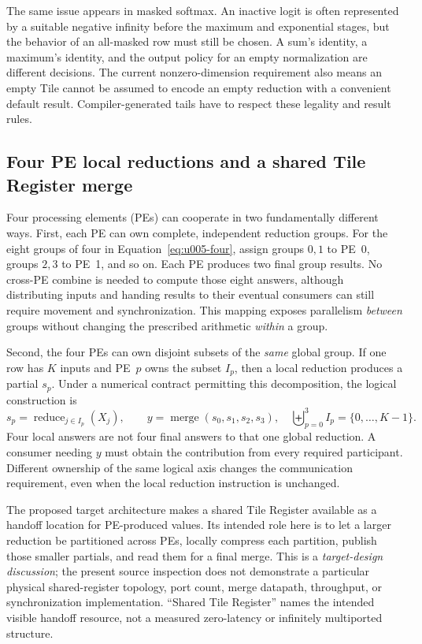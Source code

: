 The same issue appears in masked softmax. An inactive logit is often represented by a suitable negative infinity before the maximum and exponential stages, but the behavior of an all-masked row must still be chosen. A sum's identity, a maximum's identity, and the output policy for an empty normalization are different decisions. The current nonzero-dimension requirement also means an empty Tile cannot be assumed to encode an empty reduction with a convenient default result. Compiler-generated tails have to respect these legality and result rules.

\subsection{Four PE local reductions and a shared Tile Register merge}
\label{sec:u005-four-pe}

Four processing elements (PEs) can cooperate in two fundamentally different ways. First, each PE can own complete, independent reduction groups. For the eight groups of four in Equation~\ref{eq:u005-four}, assign groups $0,1$ to PE~0, groups $2,3$ to PE~1, and so on. Each PE produces two final group results. No cross-PE combine is needed to compute those eight answers, although distributing inputs and handing results to their eventual consumers can still require movement and synchronization. This mapping exposes parallelism \emph{between} groups without changing the prescribed arithmetic \emph{within} a group.

Second, the four PEs can own disjoint subsets of the \emph{same} global group. If one row has $K$ inputs and PE~$p$ owns the subset $I_p$, then a local reduction produces a partial $s_p$. Under a numerical contract permitting this decomposition, the logical construction is
\begin{equation}
 s_p=\operatorname{reduce}_{j\in I_p}(X_j),\qquad
 y=\operatorname{merge}(s_0,s_1,s_2,s_3),
 \quad \biguplus_{p=0}^{3} I_p=\{0,\ldots,K-1\}.
 \label{eq:u005-pe-partials}
\end{equation}
Four local answers are not four final answers to that one global reduction. A consumer needing $y$ must obtain the contribution from every required participant. Different ownership of the same logical axis changes the communication requirement, even when the local reduction instruction is unchanged.

The proposed target architecture makes a shared Tile Register available as a handoff location for PE-produced values. Its intended role here is to let a larger reduction be partitioned across PEs, locally compress each partition, publish those smaller partials, and read them for a final merge. This is a \emph{target-design discussion}; the present source inspection does not demonstrate a particular physical shared-register topology, port count, merge datapath, throughput, or synchronization implementation. ``Shared Tile Register'' names the intended visible handoff resource, not a measured zero-latency or infinitely multiported structure.

